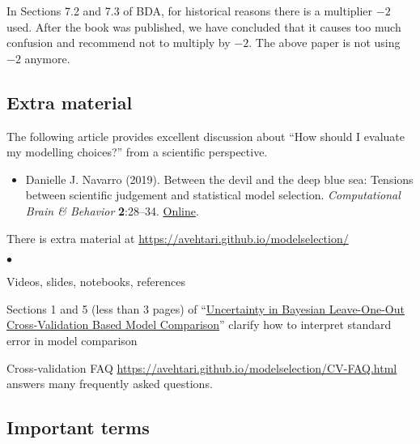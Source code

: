 \documentclass[a4paper,11pt,english]{article}
\begin{document}
\noindent
In Sections 7.2 and 7.3 of BDA, for historical reasons there is a multiplier $-2$ used. After the book was published, we have concluded that it causes too much confusion and recommend not to multiply by $-2$. The above paper is not using $-2$ anymore.\\

\subsection*{Extra material}

\noindent
The following article provides excellent discussion about ``How should I evaluate my modelling choices?'' from a scientific perspective.
\begin{itemize}
\item 
  Danielle J. Navarro (2019). Between the devil and the deep blue
  sea: Tensions between scientific judgement and statistical model
  selection. \textit{Computational Brain \& Behavior}
  \textbf{2}:28--34. \href{https://doi.org/10.1007/s42113-018-0019-z}{Online}.
\end{itemize}

\noindent
There is extra material at \url{https://avehtari.github.io/modelselection/}
\begin{list}{$\bullet$}{\parsep=0pt\itemsep=2pt}
\item Videos, slides, notebooks, references
\item Sections 1 and 5 (less than 3 pages) of
  ``\href{https://arxiv.org/abs/2008.10296}{Uncertainty in Bayesian
    Leave-One-Out Cross-Validation Based Model Comparison}'' clarify
  how to interpret standard error in model comparison
\item Cross-validation FAQ
  \url{https://avehtari.github.io/modelselection/CV-FAQ.html} answers
  many frequently asked questions.
\end{list}

\subsection*{Important terms}
\end{document}
